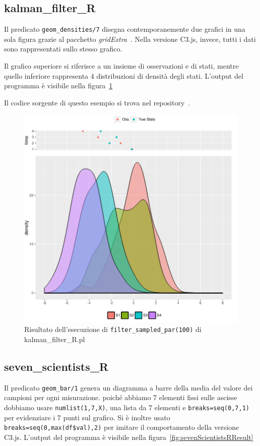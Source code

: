 \documentclass[10pt,titlepage,twoside,a4paper]{report}
\begin{document}
\subsection{kalman\_filter\_R}
Il predicato \texttt{geom\_densities/7} disegna contemporanemente
due grafici in una sola figura grazie al pacchetto
\emph{gridExtra}~\cite{gridExtra}. Nella versione C3.js, invece, tutti i dati 
sono rappresentati sullo stesso grafico.

Il grafico superiore si riferisce a un insieme di osservazioni e di stati, 
mentre quello inferiore rappresenta 4 distribuzioni di densità degli stati.
L'output del programma è visibile nella figura~\ref{fig:kalmanFilterRResult}

Il codice sorgente di questo esempio si trova nel repository~\cite{kalmanFilterRpl}.

\begin{minipage}{\textwidth}
\begin{figure}[H]
\centering
\caption{Risultato dell'esecuzione di \texttt{filter\_sampled\_par(100)} di kalman\_filter\_R.pl}
\label{fig:kalmanFilterRResult}
\includegraphics[width=.5\linewidth]{kalman_filter_R_plot.png}
\end{figure}
\end{minipage}

\subsection{seven\_scientists\_R}
Il predicato \texttt{geom\_bar/1}  genera un diagramma a barre 
della media del valore dei campioni per ogni misurazione. poiché 
abbiamo 7 elementi fissi sulle ascisse dobbiamo usare \texttt{numlist(1,7,X)}, 
una lista da 7 elementi e \texttt{breaks=seq(0,7,1)} per evidenziare i 7 
punti sul grafico. Si è inoltre usato \texttt{breaks=seq(0,max(df\$val),2)} 
per imitare il comportamento della versione C3.js. L'output del programma è 
visibile nella figura~\ref{fig:sevenScientistsRResult}
\end{document}
